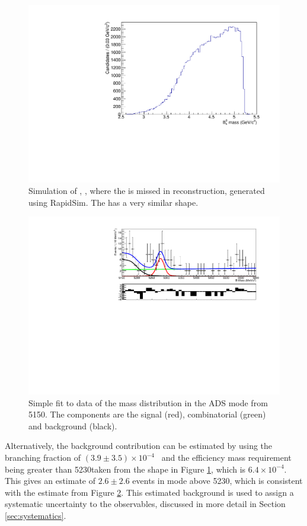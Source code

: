 \begin{figure}
\centering
\includegraphics[width=0.5\linewidth]{figures/backgrounds/BsShape.pdf}
\caption{Simulation of , , where the \pip is missed in reconstruction, generated using RapidSim. The  has a very similar shape.}
\label{Bsshape}
\end{figure}

\begin{figure}
\centering
\includegraphics[width=0.7\linewidth]{figures/backgrounds/adsfit.pdf}
\caption{Simple fit to data of the \B mass distribution in the ADS mode from 5150\mev. The components are the signal (red), combinatorial (green) and \Bs background (black).}
\label{adsfit}
\end{figure}

Alternatively, the \Bs background contribution can be estimated by using the  branching fraction of $\left(3.9 \pm 3.5\right) \times 10^{-4}$~\cite{PDG2016} and the efficiency \Bm mass requirement being greater than 5230\mev taken from the \Bs shape in Figure \ref{Bsshape}, which is $6.4 \times 10^{-4}$. This gives an estimate of $2.6 \pm 2.6$  events in \pik mode above 5230\mev, which is consistent with the estimate from Figure \ref{adsfit}. This estimated \Bs background is used to assign a systematic uncertainty to the \CP observables, discussed in more detail in Section \ref{sec:systematics}.


